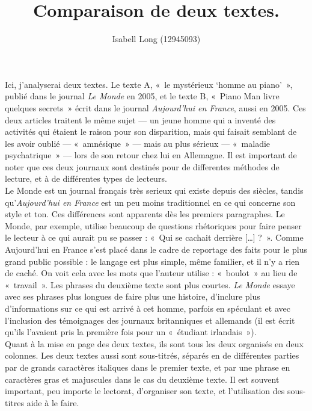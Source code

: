 \documentclass[12pt,a4paper]{article}
\begin{document}
\title{Comparaison de deux textes.}
\author{Isabell Long (12945093)}
\maketitle

Ici, j'analyserai deux textes. Le texte A, «~le mystérieux `homme au
piano'~», publié dans le journal \textit{Le Monde} en 2005, et le
texte B, «~Piano Man livre quelques secrets~» écrit dans le journal
\textit{Aujourd'hui en France}, aussi en 2005. Ces deux articles
traitent le même sujet --- un jeune homme qui a inventé des activités
qui étaient le raison pour son disparition, mais qui faisait semblant
de les avoir oublié --- «~amnésique~» --- mais au plus sérieux ---
«~maladie psychatrique~» --- lors de son retour chez lui en Allemagne.
Il est important de noter que ces deux journaux sont destinés pour de
differentes méthodes de lecture, et à de différentes types de
lecteurs.\\

Le Monde est un journal français très serieux qui existe depuis des
siècles, tandis qu'\textit{Aujourd'hui en France} est un peu moins
traditionnel en ce qui concerne son style et ton. Ces différences sont
apparents dès les premiers paragraphes. Le Monde, par exemple, utilise
beaucoup de questions rhétoriques pour faire penser le lecteur à ce
qui aurait pu se passer : «~Qui se cachait derrière [\ldots] ?~».
Comme Aujourd'hui en France s'est placé dans le cadre de reportage des
faits pour le plus grand public possible : le langage est plus simple,
même familier, et il n'y a rien de caché. On voit cela avec les mots
que l'auteur utilise : «~boulot~» au lieu de «~travail~». Les phrases
du deuxième texte sont plus courtes. \textit{Le Monde} essaye avec ses
phrases plus longues de faire plus une histoire, d'inclure plus
d'informations sur ce qui est arrivé à cet homme, parfois en spéculant
et avec l'inclusion des témoignages des journaux britanniques et
allemands (il est écrit qu'ils l'avaient pris la première fois pour un
«~étudiant irlandais~»).\\

Quant à la mise en page des deux textes, ils sont tous les deux
organisés en deux colonnes. Les deux textes aussi sont sous-titrés,
séparés en de différentes parties par de grands caractères italiques
dans le premier texte, et par une phrase en caractères gras et
majuscules dans le cas du deuxième texte. Il est souvent important,
peu importe le lectorat, d'organiser son texte, et l'utilisation des
sous-titres aide à le faire.\\
\end{document}
